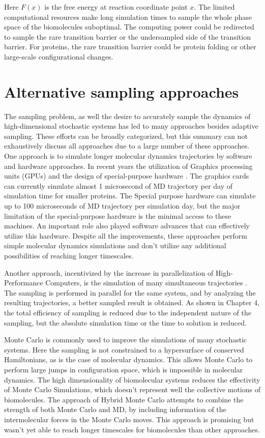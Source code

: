 Here $F(x)$ is the free energy at reaction coordinate point $x$. The limited computational resources make long simulation times to sample the whole phase space of the biomolecules suboptimal. The computing power could be redirected to sample the rare transition barrier or the undersampled side of the transition barrier. For proteins, the rare transition barrier could be protein folding or other large-scale configurational changes.


\section{\label{sec:intro2}Alternative sampling approaches}

The sampling problem, as well the desire to accurately sample the dynamics of high-dimensional stochastic systems has led to many approaches besides adaptive sampling.
These efforts can be broadly categorized, but this summary can not exhaustively discuss all approaches due to a large number of these approaches.
One approach is to simulate longer molecular dynamics trajectories by software and hardware approaches. In recent years the utilization of Graphics processing units (GPUs) and the design of special-purpose hardware \cite{shaw2014anton}. The graphics cards can currently simulate almost 1 microsecond of MD trajectory per day of simulation time for smaller proteins. The Special purpose hardware can simulate up to 100 microseconds of MD trajectory per simulation day, but the major limitation of the special-purpose hardware is the minimal access to these machines. An important role also played software advances that can effectively utilize this hardware. Despite all the improvements, these approaches perform simple molecular dynamics simulations and don't utilize any additional possibilities of reaching longer timescales.

Another approach, incentivized by the increase in parallelization of High-Performance Computers, is the simulation of many simultaneous trajectories \cite{DistComp-Shirts2000, DistComp-Buch2010}. The sampling is performed in parallel for the same system, and by analyzing the resulting trajectories, a better sampled result is obtained.  As shown in Chapter 4, the total efficiency of sampling is reduced due to the independent nature of the sampling, but the absolute simulation time or the time to solution is reduced.

Monte Carlo is commonly used to improve the simulations of many stochastic systems. Here the sampling is not constrained to a hypersurface of conserved Hamiltonians, as is the case of molecular dynamics. This allows Monte Carlo to perform large jumps in configuration space, which is impossible in molecular dynamics. The high dimensionality of biomolecular systems reduces the effectivity of Monte Carlo Simulations, which doesn't represent well the collective motions of biomolecules. The approach of Hybrid Monte Carlo attempts to combine the strength of both Monte Carlo and MD, by including information of the intermolecular forces in the Monte Carlo moves. This approach is promising but wasn't yet able to reach longer timescales for biomolecules than other approaches. 


